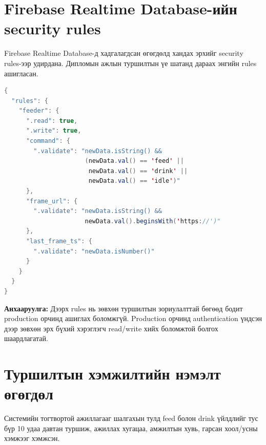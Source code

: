 \documentclass[12pt,a4paper]{report}
\begin{document}
\section{Firebase Realtime Database-ийн security rules}

Firebase Realtime Database-д хадгалагдсан өгөгдөлд хандах эрхийг security rules-ээр удирдана. Дипломын ажлын туршилтын үе шатанд дараах энгийн rules ашигласан.

\begin{lstlisting}[language=Java, caption={Firebase Realtime Database security rules}, label={lst:firebase-rules}]
{
  "rules": {
    "feeder": {
      ".read": true,
      ".write": true,
      "command": {
        ".validate": "newData.isString() &&
                      (newData.val() == 'feed' ||
                       newData.val() == 'drink' ||
                       newData.val() == 'idle')"
      },
      "frame_url": {
        ".validate": "newData.isString() &&
                      newData.val().beginsWith('https://')"
      },
      "last_frame_ts": {
        ".validate": "newData.isNumber()"
      }
    }
  }
}
\end{lstlisting}

\textbf{Анхааруулга:} Дээрх rules нь зөвхөн туршилтын зориулалттай бөгөөд бодит production орчинд ашиглах боломжгүй. Production орчинд authentication үндсэн дээр зөвхөн эрх бүхий хэрэглэгч read/write хийх боломжтой болгох шаардлагатай.

\section{Туршилтын хэмжилтийн нэмэлт өгөгдөл}

Системийн тогтвортой ажиллагааг шалгахын тулд feed болон drink үйлдлийг тус бүр 10 удаа давтан туршиж, ажиллах хугацаа, амжилтын хувь, гарсан хоол/усны хэмжээг хэмжсэн.
\end{document}
